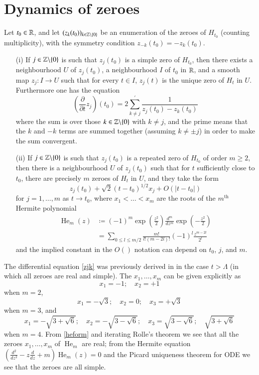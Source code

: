 \section{Dynamics of zeroes}


\begin{proposition}\label{dynam}  Let $t_0 \in \mathbb{R}$, and let $(z_k(t_0))_{k \in \mathbb{Z} \backslash \{0\}}$ be an enumeration of the zeroes of $H_{t_0}$ (counting multiplicity), with the symmetry condition $z_{-k}(t_0) = -z_k(t_0)$.
\begin{itemize}
\item[(i)]  If $j \in \mathbb{Z} \backslash \{0\}$ is such that $z_j(t_0)$ is a simple zero of $H_{t_0}$, then there exists a neighbourhood $U$ of $z_j(t_0)$, a neighbourhood $I$ of $t_0$ in $\mathbb{R}$, and a smooth map $z_j: I \to U$ such that for every $t \in I$, $z_j(t)$ is the unique zero of $H_t$ in $U$.  Furthermore one has the equation
\begin{equation}\label{zjk}
 \left(\frac{\partial}{\partial t} z_j\right)(t_0) = 2 \sum^{\prime}_{k \neq j} \frac{1}{z_j(t_0) - z_k(t_0)} 
\end{equation}
where the sum is over those $k \in \mathbb{Z} \backslash \{0\}$ with $k \neq j$, and the prime means that the $k$ and $-k$ terms are summed together (assuming $k \neq \pm j$) in order to make the sum convergent.
\item[(ii)]  If $j \in \mathbb{Z} \backslash \{0\}$ is such that $z_j(t_0)$ is a repeated zero of $H_{t_0}$ of order $m \geq 2$, then there is a neighbourhood $U$ of $z_j(t_0)$ such that for $t$ sufficiently close to $t_0$, there are precisely $m$ zeroes of $H_t$ in $U$, and they take the form
$$ z_j(t_0) + \sqrt{2} (t-t_0)^{1/2} x_j + O( |t-t_0|)$$
for $j=1,\dots,m$ as $t \to t_0$, where $x_1 < \dots < x_m$ are the roots of the $m^{\operatorname{th}}$ Hermite polynomial
\begin{align}
\operatorname{He}_m(z) &\coloneqq (-1)^m \exp\left(\frac{z^2}{2}\right) \frac{d^m}{dz^m} \exp\left(-\frac{z^2}{2}\right)\label{heform}\\
&= \sum_{0 \leq l \leq m/2} \frac{m!}{l! (m-2l)!} (-1)^l \frac{z^{m-2l}}{2^l}\label{heform2}
\end{align}
and the implied constant in the $O()$ notation can depend on $t_0$, $j$, and $m$.
\end{itemize}
\end{proposition}

The differential equation \eqref{zjk} was previously derived in \cite[Lemma 2.4]{csv} in the case $t > \Lambda$ (in which all zeroes are real and simple).
The $x_1,\dots,x_m$ can be given explicitly as
$$ x_1 = -1; \quad x_2 = +1$$
when $m=2$,
$$ x_1 = -\sqrt{3}; \quad x_2 = 0; \quad x_3 = +\sqrt{3}$$
when $m=3$, and
$$ x_1 = -\sqrt{3+\sqrt{6}}; \quad x_2 = -\sqrt{3-\sqrt{6}}; \quad x_3 = \sqrt{3 - \sqrt{6}}; \quad \sqrt{3 + \sqrt{6}}$$
when $m=4$.  From \eqref{heform} and iterating Rolle's theorem we see that all the zeroes $x_1,\dots,x_m$ of $\operatorname{He}_m$ are real; from the Hermite equation $\left(\frac{d^2}{dz^2} - z \frac{d}{dz} + m\right) \operatorname{He}_m(z) = 0$ and the Picard uniqueness theorem for ODE we see that the zeroes are all simple.

